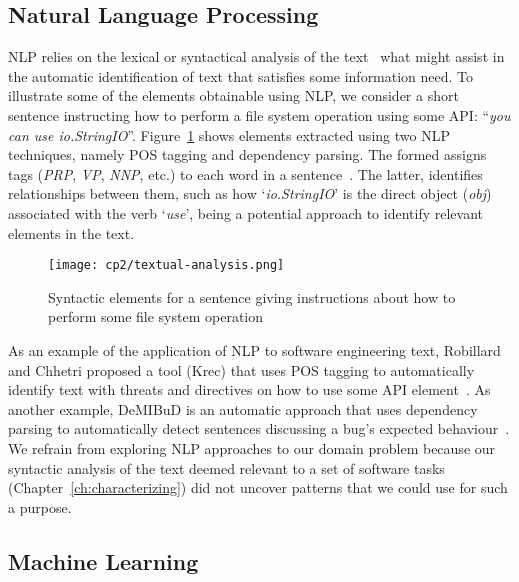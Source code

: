 \subsection{Natural Language Processing }
\label{cp2:nlp}


\acf{NLP} relies on the lexical or syntactical analysis of the text~\cite{jurafsky2014speech}
what might assist in the automatic identification of text that satisfies some information need. 
To illustrate some of the elements obtainable using \acs{NLP}, we consider a short sentence 
instructing how to perform a file system operation using some API: ``\textit{you can use io.StringIO}''.
Figure~\ref{fig:nlp-analysis} shows elements extracted using two \acs{NLP} techniques,
namely \acf{POS} tagging and dependency parsing.
The formed assigns tags  ({\small \textit{PRP}, \textit{VP}, \textit{NNP},} etc.) to each word 
in a sentence~\cite{taylor2003penn}. The latter, identifies
relationships between them, such as how 
`\textit{io.StringIO}' is the direct object (\textit{obj})
associated with the verb `\textit{use}', 
being a potential approach to identify relevant elements in the text.



\medskip
\begin{figure}[h!]
    \centering
    \texttt{[image: cp2/textual-analysis.png]}
    \caption{Syntactic elements for a sentence giving instructions about how to perform some file system operation}
    \label{fig:nlp-analysis}
\end{figure}


As an example of the application of \ac{NLP} to software engineering text,
Robillard  and Chhetri proposed a tool (Krec)
that uses \acs{POS} tagging to automatically 
identify text with threats and directives on how to use some API element~\cite{Robillard2015}.
As another example, {\small DeMIBuD}
is an automatic approach that uses dependency parsing
to automatically detect sentences discussing a bug's expected behaviour~\cite{Chaparro2017}.
We refrain from exploring \acs{NLP} approaches to our domain problem because 
our syntactic analysis of the text deemed relevant to a set of software tasks (Chapter~\ref{ch:characterizing})
did not uncover patterns that we could use for such a purpose.



\subsection{Machine Learning }
\label{cp2:machine-learning}




